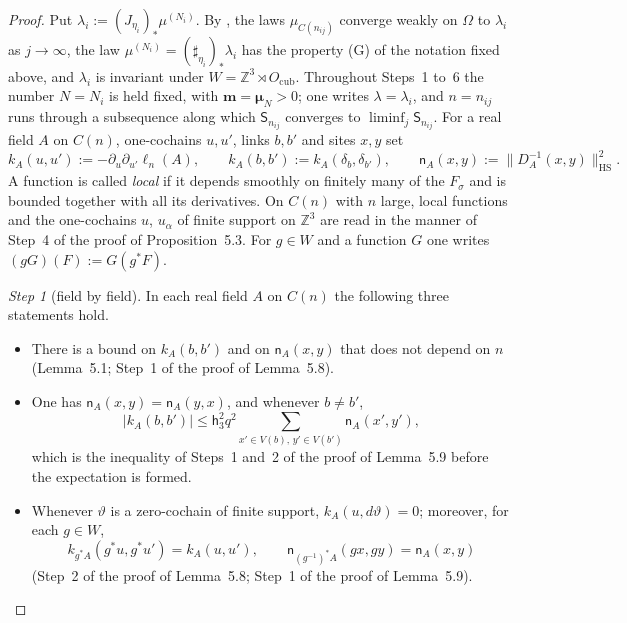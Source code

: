 \documentclass[11pt]{amsart}
\theoremstyle{definition}
\begin{document}
\begin{proof}
Put $\lambda_i:=(J_{\eta_i})_*\mu^{(N_i)}$.
By \cite[Proposition~12.15\,(a)--(c)]{QEDII}, the laws $\mu_{C(n_{ij})}$ converge weakly on $\Omega$ to $\lambda_i$ as $j\to\infty$,
the law $\mu^{(N_i)}=(\sharp_{\eta_i})_*\lambda_i$ has the property (G) of the notation fixed above,
and $\lambda_i$ is invariant under $W=\mathbb Z^3\rtimes O_{\mathrm{cub}}$.
Throughout Steps~1 to~6 the number $N=N_i$ is held fixed, with $\mathbf m=\boldsymbol\mu_N>0$;
one writes $\lambda=\lambda_i$, and $n=n_{ij}$ runs through a subsequence along which $\mathsf S_{n_{ij}}$ converges to $\liminf_j\mathsf S_{n_{ij}}$.
For a real field $A$ on $C(n)$, one-cochains $u,u'$, links $b,b'$ and sites $x,y$ set
\begin{equation*}
k_A(u,u'):=-\partial_u\partial_{u'}\ell_n(A),\qquad k_A(b,b'):=k_A(\delta_b,\delta_{b'}),\qquad\mathsf n_A(x,y):=\|D_A^{-1}(x,y)\|^2_{\mathrm{HS}}.
\end{equation*}
A function is called \emph{local} if it depends smoothly on finitely many of the $F_\sigma$ and is bounded together with all its derivatives.
On $C(n)$ with $n$ large, local functions and the one-cochains $u$, $u_\alpha$ of finite support on $\mathbb Z^3$ are read in the manner of Step~4 of the proof of Proposition~5.3.
For $g\in W$ and a function $G$ one writes $(gG)(F):=G(g^*F)$.

\emph{Step 1} (field by field).
In each real field $A$ on $C(n)$ the following three statements hold.
\begin{itemize}
\item[(i)] There is a bound on $k_A(b,b')$ and on $\mathsf n_A(x,y)$ that does not depend on $n$ (Lemma~5.1; Step~1 of the proof of Lemma~5.8).
\item[(ii)] One has $\mathsf n_A(x,y)=\mathsf n_A(y,x)$, and whenever $b\ne b'$,
\begin{equation*}
|k_A(b,b')|\le\mathsf h_3^2q^2\sum_{x'\in V(b),\,y'\in V(b')}\mathsf n_A(x',y'),
\end{equation*}
which is the inequality of Steps~1 and~2 of the proof of Lemma~5.9 before the expectation is formed.
\item[(iii)] Whenever $\vartheta$ is a zero-cochain of finite support, $k_A(u,d\vartheta)=0$;
moreover, for each $g\in W$,
\begin{equation*}
k_{g^*A}(g^*u,g^*u')=k_A(u,u'),\qquad\mathsf n_{(g^{-1})^*A}(gx,gy)=\mathsf n_A(x,y)
\end{equation*}
(Step~2 of the proof of Lemma~5.8; Step~1 of the proof of Lemma~5.9).
\end{itemize}


\end{proof}
\end{document}
